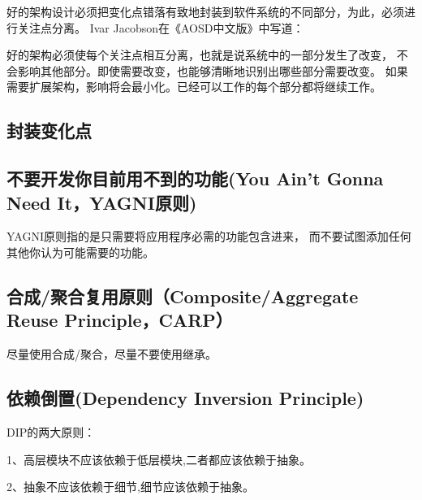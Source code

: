 \documentclass{book}
\begin{document}
好的架构设计必须把变化点错落有致地封装到软件系统的不同部分，为此，必须进行关注点分离。
Ivar Jacobson在《AOSD中文版》中写道：

好的架构必须使每个关注点相互分离，也就是说系统中的一部分发生了改变，
不会影响其他部分。即使需要改变，也能够清晰地识别出哪些部分需要改变。
如果需要扩展架构，影响将会最小化。已经可以工作的每个部分都将继续工作。\subsection{封装变化点}


\subsection{不要开发你目前用不到的功能(You Ain’t Gonna Need It，YAGNI原则)}

YAGNI原则指的是只需要将应用程序必需的功能包含进来，
而不要试图添加任何其他你认为可能需要的功能。


\subsection{合成/聚合复用原则（Composite/Aggregate Reuse Principle，CARP）}

尽量使用合成/聚合，尽量不要使用继承。

\subsection{依赖倒置(Dependency Inversion Principle)}

DIP的两大原则：

1、高层模块不应该依赖于低层模块,二者都应该依赖于抽象。

2、抽象不应该依赖于细节,细节应该依赖于抽象。
\end{document}
